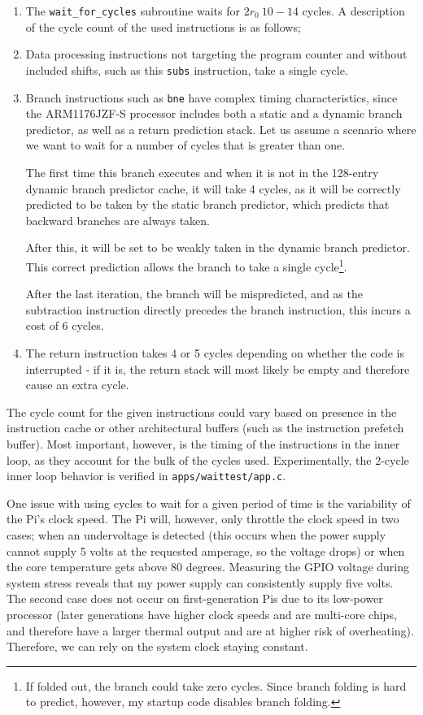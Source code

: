 \documentclass[twoside]{uva-inf-bachelor-thesis}
\newcommand{\code}[1]{\lstinline[breaklines=true]{#1}}
\begin{document}
\begin{enumerate}
    \item The \code{wait_for_cycles} subroutine waits for $2r_0 ~10-14$ cycles. A description of the cycle count of the used instructions is as follows;
    \item Data processing instructions not targeting the program counter and without included shifts, such as this \code{subs} instruction, take a single cycle\cite[p. 16-7]{arm:arm1176}.
    \item Branch instructions such as \code{bne} have complex timing characteristics, since the ARM1176JZF-S processor includes both a static and a dynamic branch predictor, as well as a return prediction stack\cite[p. 16-2]{arm:arm1176}. Let us assume a scenario where we want to wait for a number of cycles that is greater than one.

    The first time this branch executes and when it is not in the 128-entry dynamic branch predictor cache, it will take 4 cycles, as it will be correctly predicted to be taken by the static branch predictor, which predicts that backward branches are always taken\cite[p. 5-5]{arm:arm1176}.

    After this, it will be set to be weakly taken in the dynamic branch predictor. This correct prediction allows the branch to take a single cycle\footnote{If folded out, the branch could take zero cycles. Since branch folding is hard to predict, however, my startup code disables branch folding.}\cite{arm:arm1176}.

    After the last iteration, the branch will be mispredicted, and as the subtraction instruction directly precedes the branch instruction, this incurs a cost of 6 cycles.
    \item The return instruction takes 4 or 5 cycles depending on whether the code is interrupted - if it is, the return stack will most likely be empty and therefore cause an extra cycle.
\end{enumerate}

The cycle count for the given instructions could vary based on presence in the instruction cache or other architectural buffers (such as the instruction prefetch buffer). Most important, however, is the timing of the instructions in the inner loop, as they account for the bulk of the cycles used. Experimentally, the 2-cycle inner loop behavior is verified in \code{apps/waittest/app.c}.

One issue with using cycles to wait for a given period of time is the variability of the Pi's clock speed. The Pi will, however, only throttle the clock speed in two cases; when an undervoltage is detected (this occurs when the power supply cannot supply 5 volts at the requested amperage, so the voltage drops) or when the core temperature gets above 80 degrees\cite{rpi:gpuclockpower}. Measuring the GPIO voltage during system stress reveals that my power supply can consistently supply five volts. The second case does not occur on first-generation Pis due to its low-power processor (later generations have higher clock speeds and are multi-core chips, and therefore have a larger thermal output and are at higher risk of overheating). Therefore, we can rely on the system clock staying constant.
\end{document}
